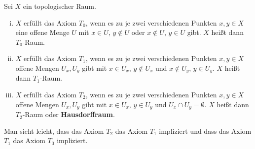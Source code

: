 \begin{bem*}
	Sei $X$ ein topologischer Raum.
	\begin{enumerate}[i)]
		\item $X$ erfüllt das Axiom $T_0$, wenn es zu je zwei verschiedenen Punkten $x,y \in X$ eine offene Menge $U$ mit $x \in U$, $y\notin U$ oder $x \notin U$, $y \in U$ gibt. $X$ heißt dann $T_0$-Raum.
		\item $X$ erfüllt das Axiom $T_1$, wenn es zu je zwei verschiedenen Punkten $x,y \in X$ offene Mengen $U_x,U_y$ gibt mit $x \in U_x$, $y \notin U_x$ und $x \notin U_y$, $y \in U_y$. $X$ heißt dann $T_1$-Raum.
		\item $X$ erfüllt das Axiom $T_2$, wenn es zu je zwei verschiedenen Punkten $x,y \in X$ offene Mengen $U_x,U_y$ gibt mit $x \in U_x$, $y \in U_y$ und $U_x \cap U_y = \emptyset$. $X$ heißt dann $T_2$-Raum oder \textbf{Hausdorffraum}.
	\end{enumerate}
	Man sieht leicht, dass das Axiom $T_2$ das Axiom $T_1$ impliziert und dass das Axiom $T_1$ das Axiom $T_0$ impliziert.
\end{bem*}

